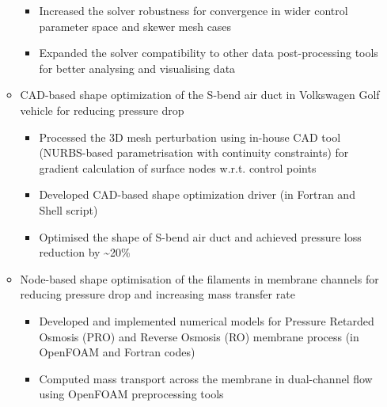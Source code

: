 \documentclass[letterpaper]{article}
\begin{document}
\begin{itemize}
\begin{itemize}
\begin{itemize}
		\item Increased the solver robustness for convergence in wider control parameter space and skewer mesh cases
		\item Expanded the solver compatibility to other data post-processing tools for better analysing and visualising data
		\end{itemize}
		\item CAD-based shape optimization of the S-bend air duct in Volkswagen Golf vehicle for reducing pressure drop
		\begin{itemize}
		\item Processed the 3D mesh perturbation using in-house CAD tool (NURBS-based parametrisation with continuity constraints) for gradient calculation of surface nodes w.r.t. control points
		\item	Developed CAD-based shape optimization driver (in Fortran and Shell script)
		\item Optimised the shape of S-bend air duct and achieved pressure loss reduction by \textasciitilde 20\%%
		\end{itemize}
		
		
		\item	Node-based shape optimisation of the filaments in membrane channels for reducing pressure drop and increasing mass transfer rate
					\begin{itemize}
					\item Developed and implemented numerical models for Pressure Retarded Osmosis (PRO) and Reverse Osmosis (RO) membrane process (in OpenFOAM and Fortran codes)
					\item Computed mass transport across the membrane in dual-channel flow using OpenFOAM preprocessing tools
					

\end{itemize}
\end{itemize}
\end{itemize}
\end{document}
